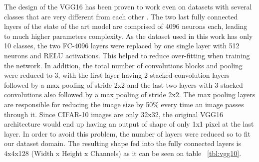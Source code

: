 The design of the VGG16 has been proven to work even on datasets with several classes that are very different from each other . The two last fully connected layers of the state of the art model are comprised of 4096 neurons each, leading to much higher parameters complexity. As the dataset used in this work has only 10 classes, the two FC-4096 layers were replaced by one single layer with 512 neurons and RELU activations. This helped to reduce over-fitting when training the network. In addition, the total number of convolutions blocks and pooling were reduced to 3, with the first layer having 2 stacked convolution layers followed by a max pooling of stride 2x2 and the last two layers with 3 stacked convolutions also followed by a max pooling of stride 2x2. The max pooling layers are responsible for reducing the image size by 50\% every time an image passes through it. Since CIFAR-10 images are only 32x32, the original VGG16 architecture would end up having an output of shape of only 1x1 pixel at the last layer. In order to avoid this problem, the number of layers were reduced so to fit our dataset domain. The resulting shape fed into the fully connected layers is 4x4x128 (Width x Height x Channels) as it can be seen on table ~\ref{tbl:vgg10}. 

